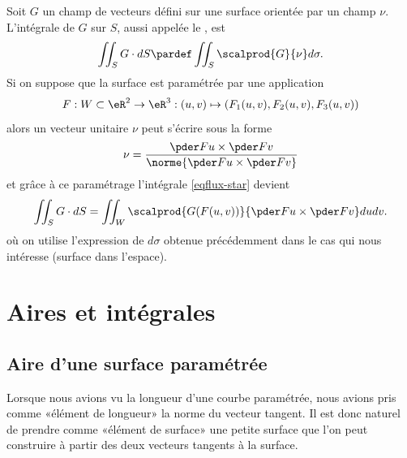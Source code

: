 Soit \( G\) un champ de vecteurs défini sur une surface orientée par un
champ \( \nu\). L'intégrale de \( G\) sur \( S\), aussi appelée le , est
\begin{equation}\label{eqflux-star}
	\iint_S G \cdot d S \pardef \iint_S \scalprod{G}{\nu} d \sigma.
\end{equation}
Si on suppose que la surface est paramétrée par une application
\begin{equation*}
	F : W \subset \eR^2 \to \eR^3 : (u,v) \mapsto (F_1(u,v),F_2(u,v),F_3(u,v))
\end{equation*}
alors un vecteur unitaire \( \nu\) peut s'écrire sous la forme
\begin{equation*}
	\nu = \frac{\pder F u \times \pder F v}{\norme{\pder F u \times \pder F v}}
\end{equation*}
et grâce à ce paramétrage l'intégrale \eqref{eqflux-star}
devient
\begin{equation*}
	\iint_S G \cdot d S = \iint_W \scalprod{G(F(u,v))}{\pder F u \times \pder F v} d u
	d v.
\end{equation*}
où on utilise l'expression de \( d \sigma\) obtenue précédemment dans le cas qui nous intéresse (surface dans l'espace).

\section{Aires et intégrales}

\subsection{Aire d'une surface paramétrée}

Lorsque nous avions vu la longueur d'une courbe paramétrée, nous avions pris comme «élément de longueur» la norme du vecteur tangent. Il est donc naturel de prendre comme «élément de surface» une petite surface que l'on peut construire à partir des deux vecteurs tangents à la surface.


